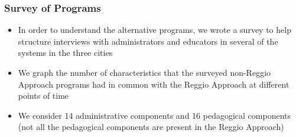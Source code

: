 \documentclass[static]{JJH-Beamer_PAGENOS}
\begin{document}

\begin{frame}
\frametitle{Survey of Programs}
\begin{itemize}
	\item In order to understand the alternative programs, we wrote a survey to help structure interviews with administrators and educators in several of the systems in the three cities
	\item We graph the number of characteristics that the surveyed non-Reggio Approach programs had in common with the Reggio Approach at different points of time
	\item We consider 14 administrative components and 16 pedagogical components (not all the pedagogical components are present in the Reggio Approach)
\end{itemize}
\end{frame}
\end{document}
